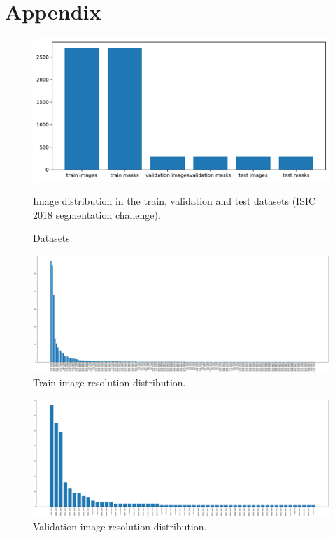 \section{Appendix}
\label{sec:appendix}

\begin{figure}[htb!]
  \centering
  \includegraphics[width=\textwidth]{assets/datasets.pdf}
  \caption{Datasets}
  {Image distribution in the train, validation and test datasets (ISIC 2018 segmentation challenge).}
  \label{datasets}
\end{figure}

\clearpage

\begin{figure}[htb!]
  \centering
  \includegraphics[width=\textwidth]{assets/train_image_resolutions.pdf}
  \caption{Train image resolution distribution.}
  \label{figure:1}
\end{figure}

\begin{figure}[htb!]
  \centering
  \includegraphics[width=\textwidth]{assets/valid_image_resolutions.pdf}
  \caption{Validation image resolution distribution.}
  \label{figure:2}
\end{figure}

